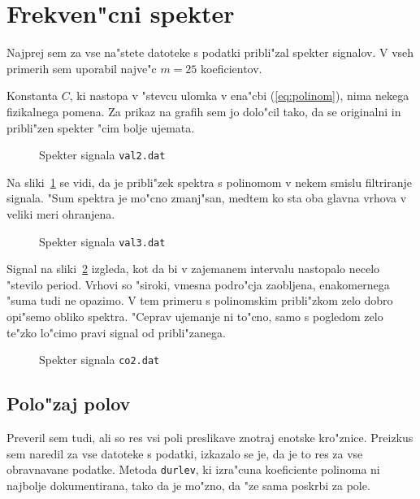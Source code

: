 \documentclass[a4paper,10pt]{article}
\begin{document}
\section{Frekven"cni spekter}

Najprej sem za vse na"stete datoteke s podatki pribli"zal spekter signalov. V vseh primerih sem uporabil najve"c $m=25$ koeficientov. 

Konstanta $C$, ki nastopa v "stevcu ulomka v ena"cbi (\ref{eq:polinom}), nima nekega fizikalnega pomena. Za prikaz na grafih sem jo dolo"cil tako, da se originalni in pribli"zen spekter "cim bolje ujemata. 

\begin{figure}[H]
 \centering
 \caption{Spekter signala \texttt{val2.dat}}
 \label{fig:psd-val2}
\end{figure}

Na sliki~\ref{fig:psd-val2} se vidi, da je pribli"zek spektra s polinomom v nekem smislu filtriranje signala. "Sum spektra je mo"cno zmanj"san, medtem ko sta oba glavna vrhova v veliki meri ohranjena. 

\begin{figure}[H]
 \centering
 \caption{Spekter signala \texttt{val3.dat}}
 \label{fig:psd-val3}
\end{figure}

Signal na sliki~\ref{fig:psd-val3} izgleda, kot da bi v zajemanem intervalu nastopalo necelo "stevilo period. Vrhovi so "siroki, vmesna podro"cja zaobljena, enakomernega "suma tudi ne opazimo. V tem primeru s polinomskim pribli"zkom zelo dobro opi"semo obliko spektra. "Ceprav ujemanje ni to"cno, samo s pogledom zelo te"zko lo"cimo pravi signal od pribli"zanega. 

\begin{figure}[H]
 \centering
 \caption{Spekter signala \texttt{co2.dat}}
 \label{fig:psd-co2}
\end{figure}




\subsection{Polo"zaj polov}

Preveril sem tudi, ali so res vsi poli preslikave znotraj enotske kro"znice. Preizkus sem naredil za vse datoteke s podatki, izkazalo se je, da je to res za vse obravnavane podatke. Metoda \texttt{durlev}, ki izra"cuna koeficiente polinoma ni najbolje dokumentirana, tako da je mo"zno, da "ze sama poskrbi za pole. 
\end{document}
